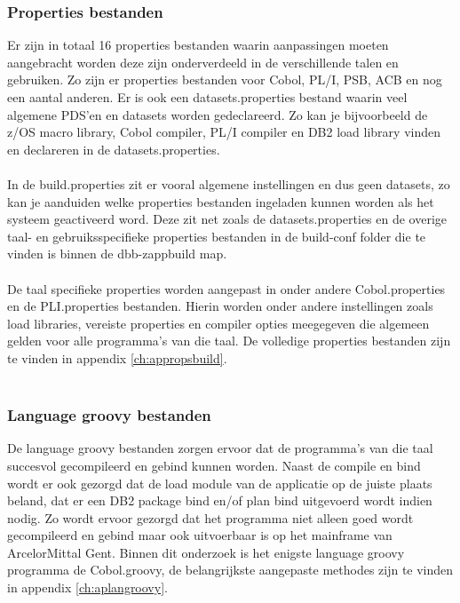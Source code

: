 \subsubsection{Properties bestanden}
Er zijn in totaal 16 properties bestanden waarin aanpassingen moeten aangebracht worden deze zijn onderverdeeld in de verschillende talen en gebruiken. Zo zijn er properties bestanden voor Cobol, PL/I, PSB, ACB en nog een aantal anderen. Er is ook een datasets.properties bestand waarin veel algemene PDS'en en datasets worden gedeclareerd. Zo kan je bijvoorbeeld de z/OS macro library, Cobol compiler, PL/I compiler en DB2 load library vinden en declareren in de datasets.properties. 
\\ \\
In de build.properties zit er vooral algemene instellingen en dus geen datasets, zo kan je aanduiden welke properties bestanden ingeladen kunnen worden als het systeem geactiveerd word. Deze zit net zoals de datasets.properties en de overige taal- en gebruiksspecifieke properties bestanden in de build-conf folder die te vinden is binnen de dbb-zappbuild map. 
\\ \\
De taal specifieke properties worden aangepast in onder andere Cobol.properties en de PLI.properties bestanden. Hierin worden onder andere instellingen zoals load libraries, vereiste properties en compiler opties meegegeven die algemeen gelden voor alle programma's van die taal. De volledige properties bestanden zijn te vinden in appendix \ref{ch:appropsbuild}.
\\ \\
\subsubsection{Language groovy bestanden}
De language groovy bestanden zorgen ervoor dat de programma's van die taal succesvol gecompileerd en gebind kunnen worden. Naast de compile en bind wordt er ook gezorgd dat de load module van de applicatie op de juiste plaats beland, dat er een DB2 package bind en/of plan bind uitgevoerd wordt indien nodig. Zo wordt ervoor gezorgd dat het programma niet alleen goed wordt gecompileerd en gebind maar ook uitvoerbaar is op het mainframe van ArcelorMittal Gent. Binnen dit onderzoek is het enigste language groovy programma de Cobol.groovy, de belangrijkste aangepaste methodes zijn te vinden in appendix \ref{ch:aplangroovy}.
\\ \\
